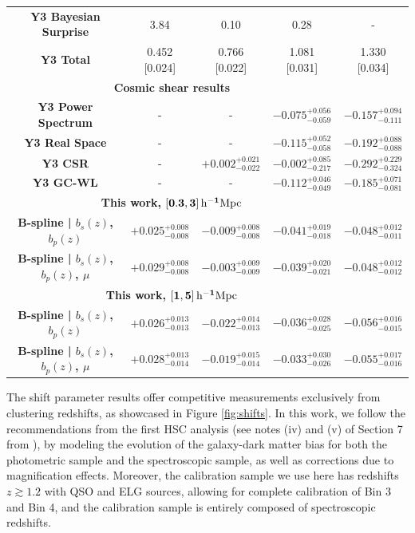 {\begin{table}[h!]
\begin{tabular}{c|c|c|c|c}
\textbf{Y3 Bayesian Surprise} & 3.84 & 0.10 & 0.28 & - \\
\textbf{Y3 Total} & 0.452 [0.024] & 0.766 [0.022] & 1.081 [0.031] & 1.330 [0.034] \\
\hline
\multicolumn{4}{c}{\textbf{Cosmic shear results}} \\ \hline
\textbf{Y3 Power Spectrum \cite{Dalal2023CosmoShearHSC}} 
    & - 
    & - 
    & $-0.075^{+0.056}_{-0.059}$ 
    & $-0.157^{+0.094}_{-0.111}$ \\ %
\textbf{Y3 Real Space \cite{CosmoShearLi2023HSCY3}} 
    & - 
    & - 
    & $-0.115^{+0.052}_{-0.058}$ 
    & $-0.192^{+0.088}_{-0.088}$ \\ %
\textbf{Y3 CSR \cite{Rana2025HSCY3CosmicShearRatios}} 
    & - 
    & $+0.002^{+0.021}_{-0.022}$
    & $-0.002^{+0.085}_{-0.217}$ 
    & $-0.292^{+0.229}_{-0.324}$ \\
\textbf{Y3 GC-WL \cite{Zhang2025RedshiftGCPointMass}}
    & - 
    & -
    & $-0.112^{+0.046}_{-0.049}$ 
    & $-0.185^{+0.071}_{-0.081}$ \\
\hline
\multicolumn{4}{c}{\textbf{This work, $\mathbf{[0.3,3]\,\mathrm{h}^{-1}\mathrm{Mpc}}$}} \\ \hline
\textbf{B-spline | $b_s(z)$, $b_p(z)$} 
    & $+0.025^{+0.008}_{-0.008}$ 
    & $-0.009^{+0.008}_{-0.008}$
    & $-0.041^{+0.019}_{-0.018}$
    & $-0.048^{+0.012}_{-0.011}$ \\ 
\textbf{B-spline | $b_s(z)$, $b_p(z)$, $\mu$} 
    & $+0.029^{+0.008}_{-0.008}$ 
    & $-0.003^{+0.009}_{-0.009}$
    & $-0.039^{+0.020}_{-0.021}$
    & $-0.048^{+0.012}_{-0.012}$ \\
\hline
\multicolumn{4}{c}{\textbf{This work, $\mathbf{[1,5]\,\mathrm{h}^{-1}\mathrm{Mpc}}$}} \\ \hline
\textbf{B-spline | $b_s(z)$, $b_p(z)$} 
    & $+0.026^{+0.013}_{-0.013}$ 
    & $-0.022^{+0.014}_{-0.013}$
    & $-0.036^{+0.028}_{-0.025}$
    & $-0.056^{+0.016}_{-0.015}$ \\
\textbf{B-spline | $b_s(z)$, $b_p(z)$, $\mu$} 
    & $+0.028^{+0.013}_{-0.014}$
    & $-0.019^{+0.015}_{-0.014}$ 
    & $-0.033^{+0.030}_{-0.026}$ 
    & $-0.055^{+0.017}_{-0.016}$ \\
\end{tabular}
\label{tab:shifts_results} 
\end{table}}

The shift parameter results offer competitive measurements exclusively from clustering redshifts, as showcased in Figure \ref{fig:shifts}. In this work, we follow the recommendations from the first HSC analysis (see notes (iv) and (v) of Section 7 from \cite{HSCClusteringRau2023}), by modeling the evolution of the galaxy-dark matter bias for both the photometric sample and the spectroscopic sample, as well as corrections due to magnification effects. Moreover, the calibration sample we use here has redshifts $z\gtrsim1.2$ with QSO and ELG sources, allowing for complete calibration of Bin 3 and Bin 4, and the calibration sample is entirely composed of spectroscopic redshifts. 

